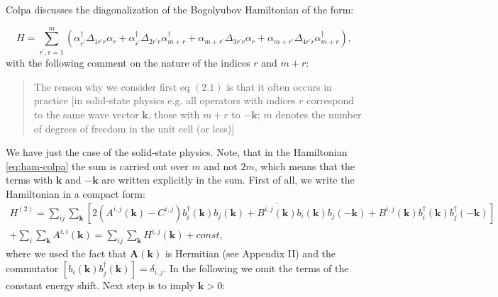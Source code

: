 \documentclass[a4paper,12pt]{article}
\begin{document}
            Colpa discusses the diagonalization of the Bogolyubov Hamiltonian of the form:

            \begin{equation}
                H = \sum_{r^{\prime}, r = 1}^m \left(\alpha_{r^{\prime}}^{\dag}\Delta_{1r^{\prime}r}\alpha_r +
                \alpha_{r^{\prime}}^{\dag}\Delta_{2r^{\prime}r}\alpha_{m+r}^{\dag} +
                \alpha_{m + r^{\prime}}\Delta_{3r^{\prime}r}\alpha_r +
                \alpha_{m + r^{\prime}}\Delta_{4r^{\prime}r}\alpha_{m + r}^{\dag}\right), \label{eq:ham-colpa}
            \end{equation}
            with the following comment on the nature of the indices $r$ and $m+r$:
            \begin{quote}
                The reason why we consider first eq $(2.1)$ is that it often occurs in practice 
                [in solid-state physics e.g. all operators with indices $r$ correspond to the same wave vector $\boldsymbol{k}$, 
                those with $m+r$ to $-\boldsymbol{k}$; $m$ denotes the number of degrees of freedom in the unit cell (or less)] 
            \end{quote}

            We have just the case of the solid-state physics. Note, that in the Hamiltonian \eqref{eq:ham-colpa} the sum is carried out over $m$ and not $2m$, 
            which means that the terms with $\boldsymbol{k}$ and $-\boldsymbol{k}$ are written explicitly in the sum. 
            First of all, we write the Hamiltonian in a compact form:
            \begin{multline}
                H^{(2)} = \sum_{ij}\sum_{\boldsymbol{k}}\left[2(A^{i,j}(\boldsymbol{k}) - C^{i,j})b^{\dag}_{i}(\boldsymbol{k})b_{j}(\boldsymbol{k}) + 
                \overline{B^{i,j}(\boldsymbol{k})}b_{i}(\boldsymbol{k})b_{j}(-\boldsymbol{k}) +
                B^{i,j}(\boldsymbol{k})b^{\dag}_{i}(\boldsymbol{k})b^{\dag}_{j}(-\boldsymbol{k})\right]\\
                +\sum_i \sum_{\boldsymbol{k}} A^{i,i}(\boldsymbol{k}) 
                = \sum_{ij}\sum_{\boldsymbol{k}} H^{i,j}(\boldsymbol{k}) 
                + const, \label{eq:ham-simple}
            \end{multline}
            where we used the fact that $\boldsymbol{A}(\boldsymbol{k})$ is Hermitian (see Appendix II) and the commutator $[b_{i}(\boldsymbol{k})b^{\dag}_{j}(\boldsymbol{k})] = \delta_{i,j}$. 
            In the following we omit the terms of the constant energy shift. Next step is to imply $\boldsymbol{k}>0$:
\end{document}
